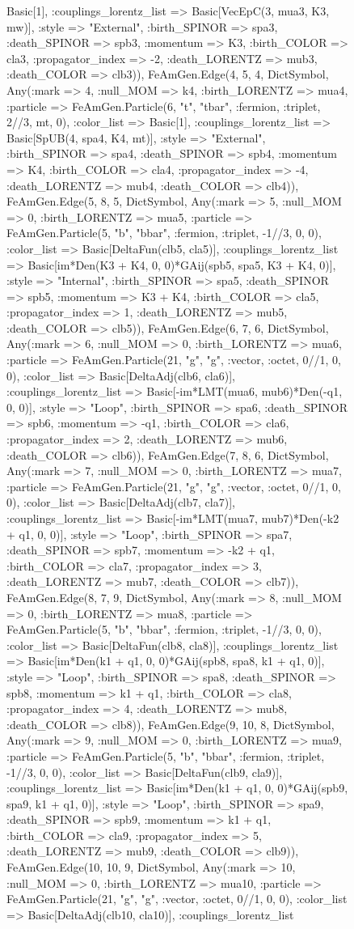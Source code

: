 \documentclass{revtex4}
\begin{document}
\begin{figure}[!htb]
\begin{center}
{Basic[1], :couplings_lorentz_list => Basic[VecEpC(3, mua3, K3, mw)], :style => "External", :birth_SPINOR => spa3, :death_SPINOR => spb3, :momentum => K3, :birth_COLOR => cla3, :propagator_index => -2, :death_LORENTZ => mub3, :death_COLOR => clb3)), FeAmGen.Edge(4, 5, 4, Dict{Symbol, Any}(:mark => 4, :null_MOM => k4, :birth_LORENTZ => mua4, :particle => FeAmGen.Particle(6, "t", "tbar", :fermion, :triplet, 2//3, mt, 0), :color_list => Basic[1], :couplings_lorentz_list => Basic[SpUB(4, spa4, K4, mt)], :style => "External", :birth_SPINOR => spa4, :death_SPINOR => spb4, :momentum => K4, :birth_COLOR => cla4, :propagator_index => -4, :death_LORENTZ => mub4, :death_COLOR => clb4)), FeAmGen.Edge(5, 8, 5, Dict{Symbol, Any}(:mark => 5, :null_MOM => 0, :birth_LORENTZ => mua5, :particle => FeAmGen.Particle(5, "b", "bbar", :fermion, :triplet, -1//3, 0, 0), :color_list => Basic[DeltaFun(clb5, cla5)], :couplings_lorentz_list => Basic[im*Den(K3 + K4, 0, 0)*GAij(spb5, spa5, K3 + K4, 0)], :style => "Internal", :birth_SPINOR => spa5, :death_SPINOR => spb5, :momentum => K3 + K4, :birth_COLOR => cla5, :propagator_index => 1, :death_LORENTZ => mub5, :death_COLOR => clb5)), FeAmGen.Edge(6, 7, 6, Dict{Symbol, Any}(:mark => 6, :null_MOM => 0, :birth_LORENTZ => mua6, :particle => FeAmGen.Particle(21, "g", "g", :vector, :octet, 0//1, 0, 0), :color_list => Basic[DeltaAdj(clb6, cla6)], :couplings_lorentz_list => Basic[-im*LMT(mua6, mub6)*Den(-q1, 0, 0)], :style => "Loop", :birth_SPINOR => spa6, :death_SPINOR => spb6, :momentum => -q1, :birth_COLOR => cla6, :propagator_index => 2, :death_LORENTZ => mub6, :death_COLOR => clb6)), FeAmGen.Edge(7, 8, 6, Dict{Symbol, Any}(:mark => 7, :null_MOM => 0, :birth_LORENTZ => mua7, :particle => FeAmGen.Particle(21, "g", "g", :vector, :octet, 0//1, 0, 0), :color_list => Basic[DeltaAdj(clb7, cla7)], :couplings_lorentz_list => Basic[-im*LMT(mua7, mub7)*Den(-k2 + q1, 0, 0)], :style => "Loop", :birth_SPINOR => spa7, :death_SPINOR => spb7, :momentum => -k2 + q1, :birth_COLOR => cla7, :propagator_index => 3, :death_LORENTZ => mub7, :death_COLOR => clb7)), FeAmGen.Edge(8, 7, 9, Dict{Symbol, Any}(:mark => 8, :null_MOM => 0, :birth_LORENTZ => mua8, :particle => FeAmGen.Particle(5, "b", "bbar", :fermion, :triplet, -1//3, 0, 0), :color_list => Basic[DeltaFun(clb8, cla8)], :couplings_lorentz_list => Basic[im*Den(k1 + q1, 0, 0)*GAij(spb8, spa8, k1 + q1, 0)], :style => "Loop", :birth_SPINOR => spa8, :death_SPINOR => spb8, :momentum => k1 + q1, :birth_COLOR => cla8, :propagator_index => 4, :death_LORENTZ => mub8, :death_COLOR => clb8)), FeAmGen.Edge(9, 10, 8, Dict{Symbol, Any}(:mark => 9, :null_MOM => 0, :birth_LORENTZ => mua9, :particle => FeAmGen.Particle(5, "b", "bbar", :fermion, :triplet, -1//3, 0, 0), :color_list => Basic[DeltaFun(clb9, cla9)], :couplings_lorentz_list => Basic[im*Den(k1 + q1, 0, 0)*GAij(spb9, spa9, k1 + q1, 0)], :style => "Loop", :birth_SPINOR => spa9, :death_SPINOR => spb9, :momentum => k1 + q1, :birth_COLOR => cla9, :propagator_index => 5, :death_LORENTZ => mub9, :death_COLOR => clb9)), FeAmGen.Edge(10, 10, 9, Dict{Symbol, Any}(:mark => 10, :null_MOM => 0, :birth_LORENTZ => mua10, :particle => FeAmGen.Particle(21, "g", "g", :vector, :octet, 0//1, 0, 0), :color_list => Basic[DeltaAdj(clb10, cla10)], :couplings_lorentz_list }
\end{center}
\end{figure}
\end{document}
